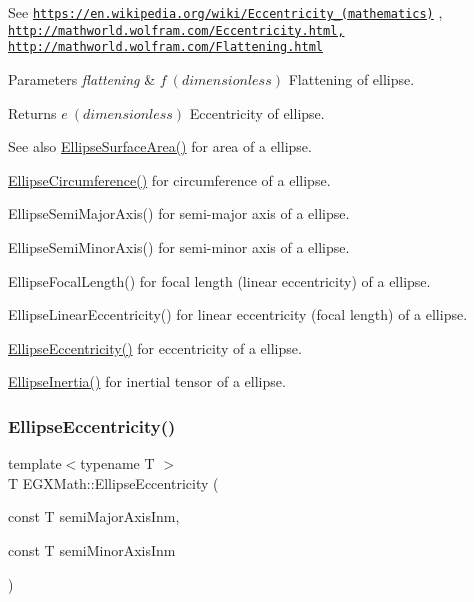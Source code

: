 See \href{https://en.wikipedia.org/wiki/Eccentricity_(mathematics)}{\tt https\+://en.\+wikipedia.\+org/wiki/\+Eccentricity\+\_\+(mathematics)} , \href{http://mathworld.wolfram.com/Eccentricity.html,}{\tt http\+://mathworld.\+wolfram.\+com/\+Eccentricity.\+html,} \href{http://mathworld.wolfram.com/Flattening.html}{\tt http\+://mathworld.\+wolfram.\+com/\+Flattening.\+html} 
\begin{DoxyParams}{Parameters}
{\em flattening} & $ f\ (dimensionless)$ Flattening of ellipse. \\
\hline
\end{DoxyParams}
\begin{DoxyReturn}{Returns}
$ e\ (dimensionless)$ Eccentricity of ellipse. 
\end{DoxyReturn}
\begin{DoxySeeAlso}{See also}
\mbox{\hyperlink{group___e_g_x_math-_geometry-2_d-_ellipse-_surface_area_ga4ce8c8323e9718ce5458f4ab7f6d823d}{Ellipse\+Surface\+Area()}} for area of a ellipse. 

\mbox{\hyperlink{group___e_g_x_math-_geometry-2_d-_ellipse-_circumference_ga4172802ac674eb53467b44928ac635c7}{Ellipse\+Circumference()}} for circumference of a ellipse. 

Ellipse\+Semi\+Major\+Axis() for semi-\/major axis of a ellipse. 

Ellipse\+Semi\+Minor\+Axis() for semi-\/minor axis of a ellipse. 

Ellipse\+Focal\+Length() for focal length (linear eccentricity) of a ellipse. 

Ellipse\+Linear\+Eccentricity() for linear eccentricity (focal length) of a ellipse. 

\mbox{\hyperlink{group___e_g_x_math-_geometry-2_d-_ellipse-_eccentricity_ga4e01cf027d303bb4ecb75606e5240d6c}{Ellipse\+Eccentricity()}} for eccentricity of a ellipse. 

\mbox{\hyperlink{group___e_g_x_math-_geometry-2_d-_ellipse-_inertia_ga10a3049c2f04b50f271fb01dc62e4cf8}{Ellipse\+Inertia()}} for inertial tensor of a ellipse. 
\end{DoxySeeAlso}
\mbox{\label{group___e_g_x_math-_geometry-2_d-_ellipse-_eccentricity_ga4e01cf027d303bb4ecb75606e5240d6c}} 
\subsubsection{\texorpdfstring{Ellipse\+Eccentricity()}{EllipseEccentricity()}\hspace{0.1cm}{\footnotesize\ttfamily [2/2]}}
{\footnotesize\ttfamily template$<$typename T $>$ \\
T E\+G\+X\+Math\+::\+Ellipse\+Eccentricity (\begin{DoxyParamCaption}\item[{const T}]{semi\+Major\+Axis\+Inm,  }\item[{const T}]{semi\+Minor\+Axis\+Inm }\end{DoxyParamCaption})}




